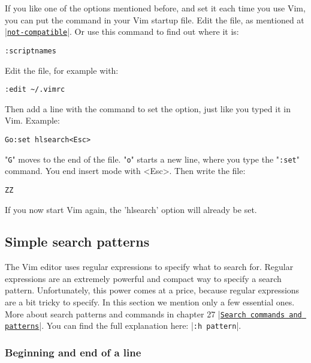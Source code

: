 If you like one of the options mentioned before, and set it each time you use Vim, you can put the command in your Vim startup file.
Edit the file, as mentioned at \hyperref[not-compatible]{|\texttt{not-compatible}|}.
Or use this command to find out where it is:

 \begin{Verbatim}[samepage=true]
 :scriptnames
 \end{Verbatim}

Edit the file, for example with:

 \begin{Verbatim}[samepage=true]
 :edit ~/.vimrc
 \end{Verbatim}

Then add a line with the command to set the option, just like you typed it in Vim.
Example:

 \begin{Verbatim}[samepage=true]
 Go:set hlsearch<Esc>
 \end{Verbatim}

"\verb!G!" moves to the end of the file.
"\verb!o!" starts a new line, where you type the "\verb!:set!" command.
You end insert mode with <Esc>.
Then write the file:

 \begin{Verbatim}[samepage=true]
 ZZ
 \end{Verbatim}

If you now start Vim again, the 'hlsearch' option will already be set.

\subsection{Simple search patterns}
\label{Simple search patterns}

The Vim editor uses regular expressions to specify what to search for.
Regular expressions are an extremely powerful and compact way to specify a search pattern.
Unfortunately, this power comes at a price, because regular expressions are a bit tricky to specify.
In this section we mention only a few essential ones.
More about search patterns and commands in chapter 27 |\hyperref[Search commands and patterns]{\texttt{Search commands and patterns}}|.
You can find the full explanation here: |\verb!:h pattern!|.

\subsubsection{Beginning and end of a line}

